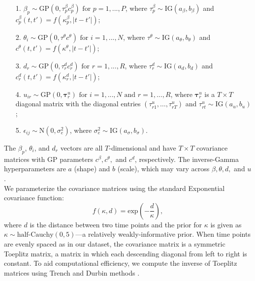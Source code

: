 \documentclass[a4paper]{article}
\begin{document}
\begin{center}
\begin{itemize}
	\item[1.] $\beta_{p}\sim \mbox{GP}(0, \tau^{\beta}_pc^\beta_{p})\mbox{ for }p = 1,...,P$, where $\tau^{\beta}_p \sim \mbox{IG}(a_\beta, b_\beta)$ and $c^\beta_p(t, t')=f(\kappa^\beta_{p}, |t-t'|)$;
	\item[2.] $\theta_{i}\sim \mbox{GP}(0, \tau^{\theta}c^\theta)\mbox{ for }i = 1,...,N$, where $\tau^{\theta}\sim \mbox{IG}(a_\theta, b_\theta)$ and $c^\theta(t, t')=f(\kappa^\theta, |t-t'|)$;
	\item[3.] $d_{r}\sim \mbox{GP}(0, \tau^{d}_r c^d_r)\mbox{ for }r = 1,...,R$, where $\tau_r^{d} \sim \mbox{IG}(a_d, b_d)$ and  $c^d_r(t, t')=f(\kappa^d_{r}, |t-t'|)$;
	\item[4.] $u_{ir}\sim\mbox{GP}(0, \boldsymbol{\tau}^u_{r})\mbox{ for }i = 1,...,N \mbox{ and } r=1,...,R$, where $ \boldsymbol{\tau}^u_{r}$ is a $T\times T$ diagonal matrix with the diagonal entries $({\tau}^u_{r1},\ldots, {\tau}^u_{rT})$ and ${\tau}^u_{rt}\sim \mbox{IG}(a_u, b_u)$;
	\item[5.] $\epsilon_{ij} \sim \mbox{N}(0, \sigma_e^2)$, where $\sigma_e^2 \sim \mbox{IG}(a_\sigma, b_\sigma)$. 
\end{itemize}
\end{center}
The $\beta_{p}$, $\theta_{i}$, and $d_r$ vectors are all $T$-dimensional and have $T\times T$ covariance matrices with GP parameters $c^\beta, c^\theta,$ and  $c^d$, respectively. The inverse-Gamma hyperparameters are $a$ (shape) and $b$ (scale), which may vary across $\beta, \theta, d,$ and  $u$. %
\\ \newline
We parameterize the covariance matrices using the standard Exponential covariance function:
\begin{equation*}
f(\kappa, d) = \mbox{exp}\left(-\frac{d}{\kappa}\right),
\end{equation*}
where $d$ is the distance between two time points and the prior for $\kappa$ is given as $\kappa \sim \mbox{half-Cauchy}(0, 5)$---a relatively weakly-informative prior. When time points are evenly spaced as in our dataset, the covariance matrix is a symmetric Toeplitz matrix, a matrix in which each descending diagonal from left to right is constant. To aid computational efficiency, we compute the inverse of Toeplitz matrices using Trench and Durbin methods \citep{golub2012matrix}. \\ \newline
\end{document}
